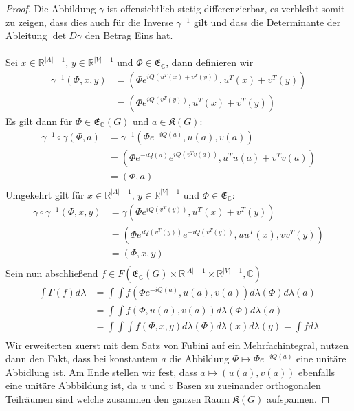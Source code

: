 \documentclass[11pt,a4paper,leqno]{report}
\numberwithin{equation}{chapter}
\begin{document}
\begin{proof}
	Die Abbildung $\gamma$ ist offensichtlich stetig differenzierbar, es verbleibt somit zu zeigen, dass dies auch f\"ur die Inverse $\gamma^{-1}$ gilt und dass die Determinante der Ableitung $\det{D\gamma}$ den Betrag Eins hat.\\
	\\
	Sei $x\in \mathbb{R}^{|A|-1}$, $y\in \mathbb{R}^{|V|-1}$ und $\Phi\in\mathfrak{E}_\mathbb{C}$, dann definieren wir
	\begin{align*}
		\gamma^{-1}(\Phi, x, y) &= (\Phi e^{iQ(u^T(x)+v^T(y))},u^T(x)+v^T(y))\\
		&= (\Phi e^{iQ(v^T(y))},u^T(x)+v^T(y))
	\end{align*}
	Es gilt dann f\"ur $\Phi\in\mathfrak{E}_\mathbb{C}(G)$ und $a\in\mathfrak{K}(G)$:
	\begin{align*}
		\gamma^{-1}\circ\gamma(\Phi, a) &= \gamma^{-1}(\Phi e^{-iQ(a)}, u(a), v(a))\\
		&= (\Phi e^{-iQ(a)}e^{iQ(v^Tv(a))}, u^Tu(a) + v^Tv(a))\\
		&= (\Phi , a)\\
	\end{align*}
	Umgekehrt gilt f\"ur $x\in \mathbb{R}^{|A|-1}$, $y\in \mathbb{R}^{|V|-1}$ und $\Phi\in\mathfrak{E}_\mathbb{C}$:
	\begin{align*}
		\gamma\circ\gamma^{-1}(\Phi, x, y)&= \gamma(\Phi e^{iQ(v^T(y))},u^T(x)+v^T(y))\\
		&= (\Phi e^{iQ(v^T(y))}e^{-iQ(v^T(y))},uu^T(x),vv^T(y))\\
		&= (\Phi,x,y)\\
	\end{align*}
Sein nun abschlie\ss{}end $f\in F(\mathfrak{E}_\mathbb{C}(G)\times\mathbb{R}^{|A|-1}\times\mathbb{R}^{|V|-1}, \mathbb{C})$
\begin{align*}
	\int \Gamma(f) d\lambda &= \int\int f(\Phi e^{-iQ(a)}, u(a), v(a))d\lambda(\Phi)d\lambda(a)\\
	&= \int\int f(\Phi, u(a), v(a))d\lambda(\Phi)d\lambda(a)\\
	&= \int\int\int f(\Phi, x, y)d\lambda(\Phi)d\lambda(x)d\lambda(y)=\int f d\lambda\\
\end{align*}
Wir erweiterten zuerst mit dem Satz von Fubini auf ein Mehrfachintegral, nutzen dann den Fakt, dass bei konstantem $a$ die Abbildung $\Phi \mapsto \Phi e^{-iQ(a)}$ eine unit\"are Abbidlung ist. Am Ende stellen wir fest, dass $a\mapsto (u(a), v(a))$ ebenfalls eine unit\"are Abbbildung ist, da $u$ und $v$ Basen zu zueinander orthogonalen Teilr\"aumen sind welche zusammen den ganzen Raum $\mathfrak{K}(G)$ aufspannen.
\end{proof}
\end{document}
